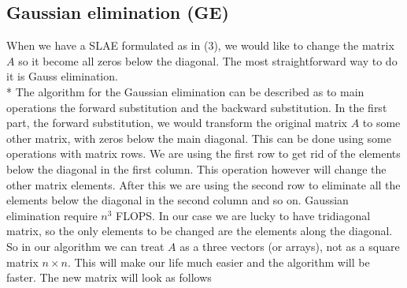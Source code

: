 \documentclass[10pt]{article}
\begin{document}
\subsection{Gaussian elimination (GE)} 
When we have a SLAE formulated as in (3), we would like to change the matrix $ A $ so it become all zeros below the diagonal. The most straightforward way to do it is Gauss elimination. \\*
The algorithm for the Gaussian elimination can be described as to main operations the forward substitution and the backward substitution. In the first part, the forward substitution, we would transform the original matrix $ A $ to some other matrix, with zeros below the main diagonal. This can be done using some operations with matrix rows. We are using the first row to get rid of the elements below the diagonal in the first column. This operation however will change the other matrix elements. After this we are using the second row to eliminate all the elements below the diagonal in the second column and so on. Gaussian elimination require $ n^{3} $ FLOPS. In our case we are lucky to have tridiagonal matrix, so the only elements to be changed are the elements along the diagonal. So in our algorithm we can treat $ A $ as a three vectors (or arrays), not as a square matrix $ n\times n $. This will make our life much easier and the algorithm will be faster.
The new matrix will look as follows 
\end{document}
